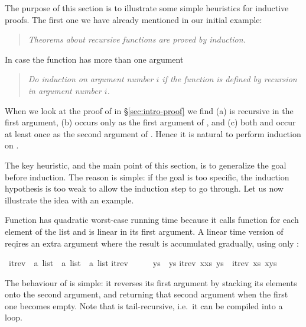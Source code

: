 %
\begin{isabellebody}%
\def\isabellecontext{Itrev}%
%
%
\begin{isamarkuptext}%
\label{sec:InductionHeuristics}
The purpose of this section is to illustrate some simple heuristics for
inductive proofs. The first one we have already mentioned in our initial
example:
\begin{quote}
\emph{Theorems about recursive functions are proved by induction.}
\end{quote}
In case the function has more than one argument
\begin{quote}
\emph{Do induction on argument number $i$ if the function is defined by
recursion in argument number $i$.}
\end{quote}
When we look at the proof of 
in \S\ref{sec:intro-proof} we find (a) \isa{{\isacharat}} is recursive in
the first argument, (b)  occurs only as the first argument of
\isa{{\isacharat}}, and (c) both  and  occur at least once as
the second argument of \isa{{\isacharat}}. Hence it is natural to perform induction
on .

The key heuristic, and the main point of this section, is to
generalize the goal before induction. The reason is simple: if the goal is
too specific, the induction hypothesis is too weak to allow the induction
step to go through. Let us now illustrate the idea with an example.

Function  has quadratic worst-case running time
because it calls function \isa{{\isacharat}} for each element of the list and
\isa{{\isacharat}} is linear in its first argument.  A linear time version of
 reqires an extra argument where the result is accumulated
gradually, using only \isa{{\isacharhash}}:%
\end{isamarkuptext}%
\ itrev\ {\isacharcolon}{\isacharcolon}\ {\isachardoublequote}{\isacharprime}a\ list\ {\isasymRightarrow}\ {\isacharprime}a\ list\ {\isasymRightarrow}\ {\isacharprime}a\ list{\isachardoublequote}\isanewline
{}\isanewline
{\isachardoublequote}itrev\ {\isacharbrackleft}{\isacharbrackright}\ \ \ \ \ ys\ {\isacharequal}\ ys{\isachardoublequote}\isanewline
{\isachardoublequote}itrev\ {\isacharparenleft}x{\isacharhash}xs{\isacharparenright}\ ys\ {\isacharequal}\ itrev\ xs\ {\isacharparenleft}x{\isacharhash}ys{\isacharparenright}{\isachardoublequote}%
\begin{isamarkuptext}%
\noindent
The behaviour of  is simple: it reverses
its first argument by stacking its elements onto the second argument,
and returning that second argument when the first one becomes
empty. Note that  is tail-recursive, i.e.\ it can be
compiled into a loop.


\end{isamarkuptext}
\end{isabellebody}
